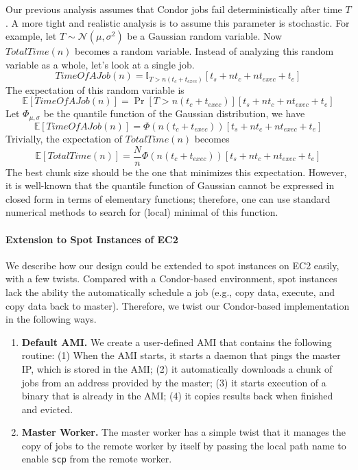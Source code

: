 \documentclass[11pt]{article}
\begin{document}
Our previous analysis assumes that Condor jobs fail
deterministically after time $T$. A more tight and realistic
analysis is to assume this parameter is stochastic. For example,
let $T\sim\mathcal{N}(\mu, \sigma^2)$ be a Gaussian random variable.
Now $TotalTime(n)$ becomes a random variable.
Instead of analyzing this random variable as a whole, let's
look at a single job.
\[
TimeOfAJob(n) = \mathbb{I}_{T>n(t_c+t_{exec})} \left[ t_s + nt_c + nt_{exec}  + t_e \right]
\]
The expectation of this random variable is
\[
\mathbb{E}\left[TimeOfAJob(n)\right] = \Pr[T>n(t_c+t_{exec})] \left[ t_s + nt_c + nt_{exec}  + t_e \right]
\]
Let $\Phi_{\mu,\sigma}$ be the quantile function
of the Gaussian distribution, we have
\[
\mathbb{E}\left[TimeOfAJob(n)\right] = \Phi(n(t_c+t_{exec})) \left[ t_s + nt_c + nt_{exec}  + t_e \right]
\]
Trivially, the expectation of $TotalTime(n)$ becomes
\[
\mathbb{E}\left[TotalTime(n)\right] = \frac{N}{n} \Phi(n(t_c+t_{exec})) \left[ t_s + nt_c + nt_{exec}  + t_e \right]
\]
The best chunk size should be the one that minimizes this 
expectation. However, it is well-known that the quantile
function of Gaussian cannot be expressed in closed form in 
terms of elementary functions; therefore, one can use
standard numerical methods to search for (local) minimal
of this function.


\paragraph*{Extension to Spot Instances of EC2}

We describe how our design could be extended to spot instances
on EC2 easily, with a few twists. Compared with a Condor-based
environment, spot instances lack the ability the automatically
schedule a job (e.g., copy data, execute, and copy data back
to master). Therefore, we twist our Condor-based implementation
in the following ways.
\begin{enumerate}
\item {\bf Default AMI.} We create a user-defined AMI that contains
the following routine: (1) When the AMI starts, it starts a daemon
that pings the master IP, which is stored in the AMI; (2) it
automatically downloads a chunk of jobs from an address provided
by the master; (3) it starts execution of a binary that is
already in the AMI; (4) it copies results back when finished
and evicted.
\item {\bf Master Worker.} The master worker has a simple twist
that it manages the copy of jobs to the remote worker by itself
by passing the local path name to enable \texttt{scp} from 
the remote worker. 
\end{enumerate}
\end{document}
